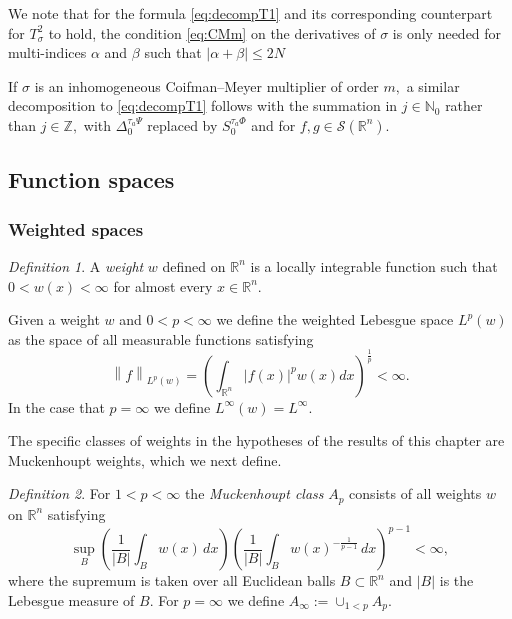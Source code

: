 \documentclass[10pt,a4paper]{article}
\theoremstyle{remark}
\newtheorem{dfn}{Definition}[section]
\newcommand{\naz}{\mathbb{N}_0}
\newcommand{\ent}{\mathbb{Z}}
\newcommand{\rn}{{{\mathbb R}^n}}
\newcommand{\sw}{{\mathcal{S}}(\rn)}
\newcommand{\dx}{\, dx}
\newcommand{\abs}[1]{\left\vert #1 \right\vert}
\newcommand{\norm}[2]{\left\|#1\right\|_{#2}}
\begin{document}
We note that for the formula \eqref{eq:decompT1} and its corresponding counterpart for $T^2_\sigma$ to hold, the condition \eqref{eq:CMm} on the derivatives of $\sigma$ is only needed for multi-indices $\alpha$ and $\beta$ such that  $\abs{\alpha+\beta}\le 2N$

If $\sigma$ is an inhomogeneous Coifman--Meyer multiplier of order $m,$ a similar decomposition to \eqref{eq:decompT1} follows  with the summation in $j\in\naz$ rather than $j\in\ent,$  with  $\Delta_0^{\tau_a \Psi}$ replaced by $S_0^{\tau_a\Phi}$ and for $f,g\in \sw.$




\subsection{Function spaces}

\subsubsection{Weighted spaces}

\begin{dfn}
A \textit{weight} $w$ defined on $\rn$ is a locally integrable function such that $0<w(x)<\infty$ for almost every $x\in\rn$.
\end{dfn}

Given a weight $w$ and $0<p<\infty$ we define the weighted Lebesgue space $L^p(w)$ as the space of all measurable functions satisfying 
\[ \norm{f}{L^p(w)} = \left(\int_\rn |f(x)|^p w(x)dx\right)^{\frac{1}{p}} < \infty. \]
In the case that $p=\infty$ we define $L^\infty (w) = L^\infty$. 

The specific classes of weights in the hypotheses of the results of this chapter are Muckenhoupt weights, which we next define. 
\begin{dfn}
For $1<p<\infty$ the \textit{Muckenhoupt class} $A_p$ consists of all weights $w$ on $\rn$ satisfying 
 \begin{equation}\label{weight_condition}
 \sup_B\left(\frac{1}{\abs{B}}\int_Bw(x)\dx\right)\left(\frac{1}{\abs{B}}\int_Bw(x)^{-\frac{1}{p-1}}\dx\right)^{p-1}<\infty,
 \end{equation}
where the supremum is taken over all Euclidean balls $B\subset\rn$ and $|B|$ is the Lebesgue measure of $B$. For $p=\infty$ we define $A_\infty := \cup_{1<p} A_p$. 
\end{dfn}
\end{document}
